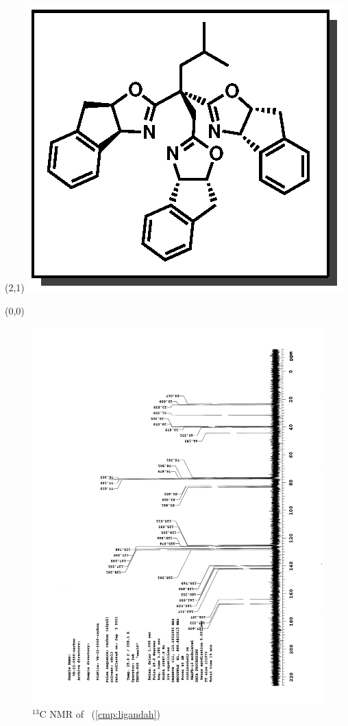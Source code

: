 \begin{textblock}{1}(2,1)
\includegraphics[scale=0.8, angle=90]{chp_asymmetric/images/ligandah}
\end{textblock}
\clearpage
\begin{textblock}{20}(0,0)
\begin{figure}[htb]
\caption{$^{13}$C NMR of  \CMPligandah\ (\ref{cmp:ligandah})}
\includegraphics[scale=0.75, trim = 0mm 0mm 0mm 5mm,
clip]{chp_asymmetric/images/nmr/ligandahC}
\vspace{-100pt}
\end{figure}
\end{textblock}
